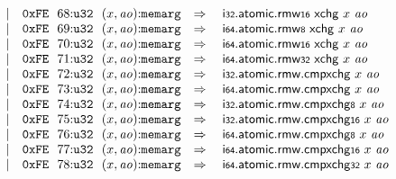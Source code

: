 $$\begin{array}[t]{@{}lrrl@{}l@{}l@{}l@{}}
& & | & \mathtt{0xFE}~~68{:}{\mathtt{u32}}~~(x, {\mathit{ao}}){:}{\mathtt{memarg}} & \quad\Rightarrow\quad{} & {\mathsf{i{\scriptstyle 32}}{.}\mathsf{atomic}{.}\mathsf{rmw}}{\mathsf{{\scriptstyle 16}}}~\mathsf{xchg}~x~{\mathit{ao}} \\
& & | & \mathtt{0xFE}~~69{:}{\mathtt{u32}}~~(x, {\mathit{ao}}){:}{\mathtt{memarg}} & \quad\Rightarrow\quad{} & {\mathsf{i{\scriptstyle 64}}{.}\mathsf{atomic}{.}\mathsf{rmw}}{\mathsf{{\scriptstyle 8}}}~\mathsf{xchg}~x~{\mathit{ao}} \\
& & | & \mathtt{0xFE}~~70{:}{\mathtt{u32}}~~(x, {\mathit{ao}}){:}{\mathtt{memarg}} & \quad\Rightarrow\quad{} & {\mathsf{i{\scriptstyle 64}}{.}\mathsf{atomic}{.}\mathsf{rmw}}{\mathsf{{\scriptstyle 16}}}~\mathsf{xchg}~x~{\mathit{ao}} \\
& & | & \mathtt{0xFE}~~71{:}{\mathtt{u32}}~~(x, {\mathit{ao}}){:}{\mathtt{memarg}} & \quad\Rightarrow\quad{} & {\mathsf{i{\scriptstyle 64}}{.}\mathsf{atomic}{.}\mathsf{rmw}}{\mathsf{{\scriptstyle 32}}}~\mathsf{xchg}~x~{\mathit{ao}} \\
& & | & \mathtt{0xFE}~~72{:}{\mathtt{u32}}~~(x, {\mathit{ao}}){:}{\mathtt{memarg}} & \quad\Rightarrow\quad{} & \mathsf{i{\scriptstyle 32}}{.}\mathsf{atomic}{.}\mathsf{rmw}{.}\mathsf{cmpxchg}~x~{\mathit{ao}} \\
& & | & \mathtt{0xFE}~~73{:}{\mathtt{u32}}~~(x, {\mathit{ao}}){:}{\mathtt{memarg}} & \quad\Rightarrow\quad{} & \mathsf{i{\scriptstyle 64}}{.}\mathsf{atomic}{.}\mathsf{rmw}{.}\mathsf{cmpxchg}~x~{\mathit{ao}} \\
& & | & \mathtt{0xFE}~~74{:}{\mathtt{u32}}~~(x, {\mathit{ao}}){:}{\mathtt{memarg}} & \quad\Rightarrow\quad{} & {\mathsf{i{\scriptstyle 32}}{.}\mathsf{atomic}{.}\mathsf{rmw}{.}\mathsf{cmpxchg}}{\mathsf{{\scriptstyle 8}}}~x~{\mathit{ao}} \\
& & | & \mathtt{0xFE}~~75{:}{\mathtt{u32}}~~(x, {\mathit{ao}}){:}{\mathtt{memarg}} & \quad\Rightarrow\quad{} & {\mathsf{i{\scriptstyle 32}}{.}\mathsf{atomic}{.}\mathsf{rmw}{.}\mathsf{cmpxchg}}{\mathsf{{\scriptstyle 16}}}~x~{\mathit{ao}} \\
& & | & \mathtt{0xFE}~~76{:}{\mathtt{u32}}~~(x, {\mathit{ao}}){:}{\mathtt{memarg}} & \quad\Rightarrow\quad{} & {\mathsf{i{\scriptstyle 64}}{.}\mathsf{atomic}{.}\mathsf{rmw}{.}\mathsf{cmpxchg}}{\mathsf{{\scriptstyle 8}}}~x~{\mathit{ao}} \\
& & | & \mathtt{0xFE}~~77{:}{\mathtt{u32}}~~(x, {\mathit{ao}}){:}{\mathtt{memarg}} & \quad\Rightarrow\quad{} & {\mathsf{i{\scriptstyle 64}}{.}\mathsf{atomic}{.}\mathsf{rmw}{.}\mathsf{cmpxchg}}{\mathsf{{\scriptstyle 16}}}~x~{\mathit{ao}} \\
& & | & \mathtt{0xFE}~~78{:}{\mathtt{u32}}~~(x, {\mathit{ao}}){:}{\mathtt{memarg}} & \quad\Rightarrow\quad{} & {\mathsf{i{\scriptstyle 64}}{.}\mathsf{atomic}{.}\mathsf{rmw}{.}\mathsf{cmpxchg}}{\mathsf{{\scriptstyle 32}}}~x~{\mathit{ao}} \\
\end{array}
$$

